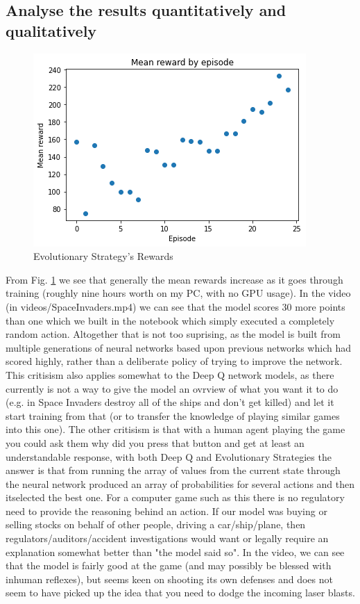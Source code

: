 \documentclass[a4pape, 11pt, english]{article}
\begin{document}
\subsection{Analyse the results quantitatively and qualitatively}

\begin{figure}[h!]
	\begin{center}
		\includegraphics{img/SpaceInvaderRewards.png}
		\caption{Evolutionary Strategy's Rewards}
		\label{fig:SpaceInvaderRewards}
	\end{center}
\end{figure}

From Fig. \ref{fig:SpaceInvaderRewards} we see that generally the mean rewards increase as it goes through training (roughly nine hours worth on my PC, with no GPU usage). In the video (in videos/SpaceInvaders.mp4) we can see that the model scores 30 more points than one which we built in the notebook which simply executed a completely random action. Altogether that is not too suprising, as the model is built from multiple generations of neural networks based upon previous networks which had scored highly, rather than a deliberate policy of trying to improve the network. This critisism also applies somewhat to the Deep Q network models, as there currently is not a way to give the model an ovrview of what you want it to do (e.g. in Space Invaders destroy all of the ships and don't get killed) and let it start training from that (or to transfer the knowledge of playing similar games into this one). The other critisism is that with a human agent playing the game you could ask them why did you press that button and get at least an understandable response, with both Deep Q and Evolutionary Strategies the answer is that from running the array of values from the current state through the neural network produced an array of probabilities for several actions and then itselected the best one.
For a computer game such as this there is no regulatory need to provide the reasoning behind an action. If our model was buying or selling stocks on behalf of other people, driving a car/ship/plane, then regulators/auditors/accident investigations would want or legally require an explanation somewhat better than "the model said so".
In the video, we can see that the model is fairly good at the game (and may possibly be blessed with inhuman reflexes), but seems keen on shooting its own defenses and does not seem to have picked up the idea that you need to dodge the incoming laser blasts.
\end{document}

